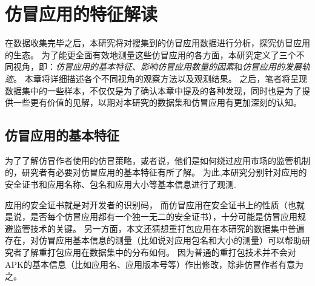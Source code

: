 \chapter{仿冒应用的特征解读}
\label{chp:discoveries}

在数据收集完毕之后，本研究将对搜集到的仿冒应用数据进行分析，探究仿冒应用的生态。
为了能更全面有效地测量这些仿冒应用的各方面，本研究定义了三个不同视角，即：\emph{仿冒应用的基本特征}、\emph{影响仿冒应用数量的因素}和\emph{仿冒应用的发展轨迹}。
本章将详细描述各个不同视角的观察方法以及观测结果。
之后，笔者将呈现数据集中的一些样本，不仅仅是为了确认本章中提及的各种发现，同时也是为了提供一些更有价值的见解，以期对本研究的数据集和仿冒应用有更加深刻的认知。

\section{仿冒应用的基本特征}
\label{sec:fakeCharacteristics}
为了了解仿冒作者使用的仿冒策略，或者说，他们是如何绕过应用市场的监管机制的，研究者有必要对仿冒应用的基本特征有所了解。
为此,本研究分别针对应用的安全证书和应用名称、包名和应用大小等基本信息进行了观测.

应用的安全证书就是对开发者的识别码，
而仿冒应用在安全证书上的性质（也就是说，是否每个仿冒应用都有一个独一无二的安全证书），十分可能是仿冒应用规避监管技术的关键。
另一方面，本文还猜想重打包应用在本研究的数据集中普遍存在，对仿冒应用基本信息的测量（比如说对应用包名和大小的测量）可以帮助研究者了解重打包应用在数据集中的分布如何。
因为普通的重打包技术并不会对APK的基本信息（比如应用名、应用版本号等）作出修改，除非仿冒作者有意为之。

